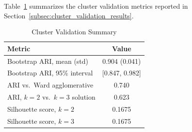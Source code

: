 \documentclass[conference]{IEEEtran}
\begin{document}
Table~\ref{tab:cluster_validation_summary} summarizes the cluster validation metrics reported in Section~\ref{subsec:cluster_validation_results}.
 
\begin{table}[h]
\caption{Cluster Validation Summary}
\label{tab:cluster_validation_summary}
\centering
\begin{tabular}{@{}lc@{}}
\toprule
Metric & Value \\
\midrule
Bootstrap ARI, mean (std) & 0.904 (0.041) \\
Bootstrap ARI, 95\% interval & [0.847, 0.982] \\
ARI vs.\ Ward agglomerative & 0.740 \\
ARI, $k{=}2$ vs.\ $k{=}3$ solution & 0.623 \\
Silhouette score, $k{=}2$ & 0.1675 \\
Silhouette score, $k{=}3$ & 0.1675 \\
\bottomrule
\end{tabular}
\end{table}

\vspace{12pt}
\end{document}
